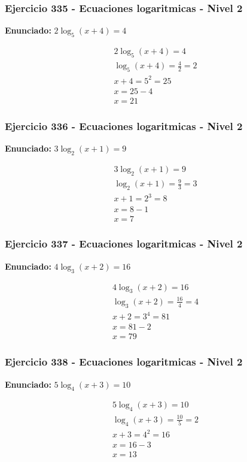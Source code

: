 \documentclass[12pt,a4paper]{article}
\begin{document}
\subsubsection*{Ejercicio 335 - Ecuaciones logaritmicas - Nivel 2}
\textbf{Enunciado:} \(2\log_{5}\left(x+4\right)=4\)

\[
\begin{aligned}
2\log_{5}\left(x+4\right)=4\\
\log_{5}\left(x+4\right)=\frac{4}{2}=2\\
x+4=5^{2}=25\\
x=25-4\\
\boxed{x=21}
\end{aligned}
\]


\subsubsection*{Ejercicio 336 - Ecuaciones logaritmicas - Nivel 2}
\textbf{Enunciado:} \(3\log_{2}\left(x+1\right)=9\)

\[
\begin{aligned}
3\log_{2}\left(x+1\right)=9\\
\log_{2}\left(x+1\right)=\frac{9}{3}=3\\
x+1=2^{3}=8\\
x=8-1\\
\boxed{x=7}
\end{aligned}
\]


\subsubsection*{Ejercicio 337 - Ecuaciones logaritmicas - Nivel 2}
\textbf{Enunciado:} \(4\log_{3}\left(x+2\right)=16\)

\[
\begin{aligned}
4\log_{3}\left(x+2\right)=16\\
\log_{3}\left(x+2\right)=\frac{16}{4}=4\\
x+2=3^{4}=81\\
x=81-2\\
\boxed{x=79}
\end{aligned}
\]


\subsubsection*{Ejercicio 338 - Ecuaciones logaritmicas - Nivel 2}
\textbf{Enunciado:} \(5\log_{4}\left(x+3\right)=10\)

\[
\begin{aligned}
5\log_{4}\left(x+3\right)=10\\
\log_{4}\left(x+3\right)=\frac{10}{5}=2\\
x+3=4^{2}=16\\
x=16-3\\
\boxed{x=13}
\end{aligned}
\]
\end{document}
